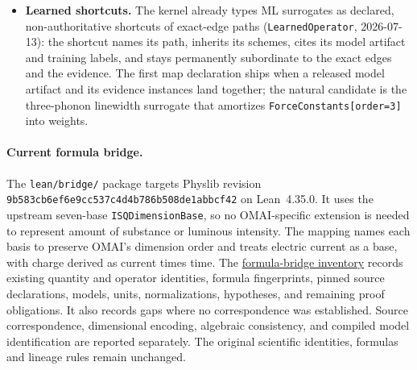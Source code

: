 \documentclass[11pt,a4paper]{article}
\begin{document}
\begin{itemize}[leftmargin=2em]
        type-checks each emission, eliminating the drift problem that plagues current
        text-token agents. The action space is finite, typed, and physically meaningful.
  \item \textbf{Learned shortcuts.} The kernel already types ML surrogates as
        declared, non-authoritative shortcuts of exact-edge paths
        (\texttt{LearnedOperator}, 2026-07-13): the shortcut names its path, inherits
        its schemes, cites its model artifact and training labels, and stays
        permanently subordinate to the exact edges and the evidence. The first map
        declaration ships when a released model artifact and its evidence instances
        land together; the natural candidate is the three-phonon linewidth surrogate
        that amortizes \texttt{ForceConstants[order=3]} into weights.
\end{itemize}

\paragraph{Current formula bridge.}
The \texttt{lean/bridge/} package targets Physlib revision
\texttt{9b583cb6ef6e9cc537c4d4b786b508de1abbcf42} on Lean~4.35.0.
It uses the upstream seven-base \texttt{ISQDimensionBase}, so no OMAI-specific
extension is needed to represent amount of substance or luminous intensity.
The mapping names each basis to preserve OMAI's dimension order and treats
electric current as a base, with charge derived as current times time.
The \href{https://openmaterials.ai/lean/bridge/}{formula-bridge inventory}
records existing quantity and operator identities, formula fingerprints,
pinned source declarations, models, units, normalizations, hypotheses, and
remaining proof obligations. It also records gaps where no correspondence was
established. Source correspondence, dimensional encoding, algebraic consistency,
and compiled model identification are reported separately. The original scientific
identities, formulas and lineage rules remain unchanged.
\end{document}
